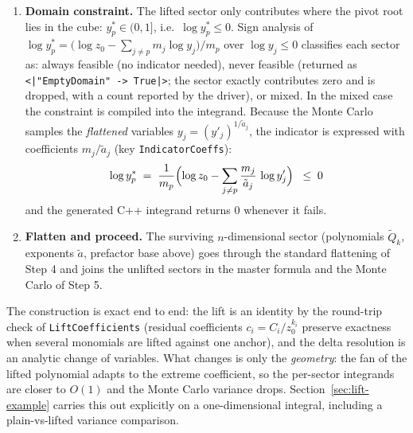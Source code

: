 \documentclass[11pt,a4paper]{article}
\begin{document}
\begin{enumerate}
  \item \textbf{Domain constraint.} The lifted sector only contributes where
    the pivot root lies in the cube: $y_p^{*} \in (0,1]$, i.e.\
    $\log y_p^{*} \leq 0$. Sign analysis of
    $\log y_p^{*} = \bigl(\log z_0 - \sum_{j\neq p} m_j \log y_j\bigr)/m_p$
    over $\log y_j \leq 0$ classifies each sector as: always feasible (no
    indicator needed), never feasible (returned as
    \texttt{<|"EmptyDomain" -> True|>}; the sector exactly contributes zero
    and is dropped, with a count reported by the driver), or mixed. In the
    mixed case the constraint is compiled into the integrand. Because the
    Monte Carlo samples the \emph{flattened} variables
    $y_j = (y'_j)^{1/\tilde{a}_j}$, the indicator is expressed with
    coefficients $m_j/\tilde{a}_j$ (key \texttt{IndicatorCoeffs}):
    \begin{equation}
    \log y_p^{*} \;=\; \frac{1}{m_p}\Bigl(\log z_0 -
      \sum_{j \neq p} \frac{m_j}{\tilde{a}_j}\,\log y'_j\Bigr)
    \;\;\leq\; 0
    \end{equation}
    and the generated C++ integrand returns $0$ whenever it fails.

  \item \textbf{Flatten and proceed.} The surviving $n$-dimensional sector
    (polynomials $\tilde{Q}_k$, exponents $\tilde{a}$, prefactor base above)
    goes through the standard flattening of Step 4 and joins the unlifted
    sectors in the master formula and the Monte Carlo of Step 5.
\end{enumerate}

The construction is exact end to end: the lift is an identity by the
round-trip check of \texttt{LiftCoefficients} (residual coefficients
$c_i = C_i / z_0^{k_i}$ preserve exactness when several monomials are lifted
against one anchor), and the delta resolution is an analytic change of
variables. What changes is only the \emph{geometry}: the fan of the lifted
polynomial adapts to the extreme coefficient, so the per-sector integrands
are closer to $O(1)$ and the Monte Carlo variance drops.
Section~\ref{sec:lift-example} carries this out explicitly on a
one-dimensional integral, including a plain-vs-lifted variance comparison.
\end{document}
